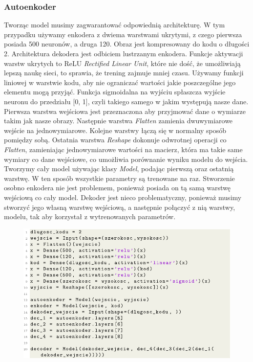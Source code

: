 \documentclass[a4paper,12pt]{book} %
\begin{document}
\subsubsection{Autoenkoder}
Tworząc model musimy zagwarantować odpowiednią architekturę. W tym przypadku używamy enkodera z dwiema warstwami ukrytymi, z czego pierwsza posiada 500 neuronów, a druga 120. Obraz jest kompresowany do kodu o długości 2. Architektura dekodera jest odbiciem lustrzanym enkodera. Funkcje aktywacji warstw ukrytych to ReLU \textit{Rectified Linear Unit}, które nie dość, że umożliwiają lepszą naukę sieci, to sprawia, że trening zajmuje mniej czasu.\cite{relu} Używamy funkcji liniowej w warstwie kodu, aby nie ograniczać wartości jakie poszczególne jego elementu mogą przyjąć. Funkcja sigmoidalna na wyjściu spłaszcza wyjście neuronu do przedziału [0, 1], czyli takiego samego w jakim występują nasze dane.\\
Pierwsza warstwa wejściowa jest przeznaczona aby przyjmować dane o wymiarze takim jak nasze obrazy. Następnie warstwa \textit{Flatten} zamienia dwuwymiarowe wejście na jednowymiarowe. Kolejne warstwy łączą się w normalny sposób pomiędzy sobą. Ostatnia warstwa \textit{Reshape} dokonuje odwrotnej operacji co \textit{Flatten}, zamieniając jednowymiarowe wartości na macierz, która ma takie same wymiary co dane wejściowe, co umożliwia porównanie wyniku modelu do wejścia. Tworzymy cały model używając klasy \textit{Model}, podając pierwszą oraz ostatnią warstwę. W ten sposób wszystkie parametry są trenowane na raz. Stworzenie osobno enkodera nie jest problemem, ponieważ posiada on tą samą warstwę wejściową co cały model. Dekoder jest nieco problematyczny, ponieważ musimy stworzyć jego własną warstwę wejściową, a następnie połączyć z nią warstwy, modelu, tak aby korzystał z wytrenowanych parametrów. 
\begin{figure}[h!]
	\centering
	\includegraphics[width=\linewidth]{modelae.pdf}
\end{figure}
\end{document}
